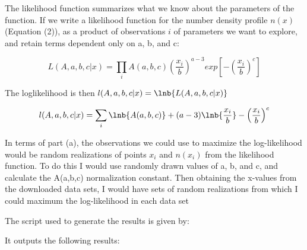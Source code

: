 

The likelihood function summarizes what we know about the parameters of the function. If we write a likelihood function for the number density profile $n(x)$ (Equation (2)), as a product of observations $i$ of parameters we want to explore, and retain terms dependent only on a, b, and c:

\begin{equation}
  L(A,a,b,c \vert x) = \prod_{i} A(a,b,c)\left(\frac{x_i}{b}\right)^{a-3}exp\left[-\left(\frac{x_i}{b}\right)^c\right]
\end{equation}

The loglikelihood is then $l(A,a,b,c \vert x) = \lnb{L(A,a,b,c \vert x)}$

\begin{equation}
  l(A,a,b,c \vert x) = \sum_{i} \lnb{A(a,b,c)} + (a-3)\lnb{\dfrac{x_i}{b}}-\left(\frac{x_i}{b}\right)^c
\end{equation}



In terms of part (a), the observations we could use to maximize the log-likelihood would be random realizations of points $x_i$ and $n(x_i)$ from the likelihood function. To do this I would use randomly drawn values of a, b, and c, and calculate the A(a,b,c) normalization constant. Then obtaining the x-values from the downloaded data sets, I would have sets of random realizations from which I could maximum the log-likelihood in each data set


The script used to generate the results is given by:


It outputs the following results:


